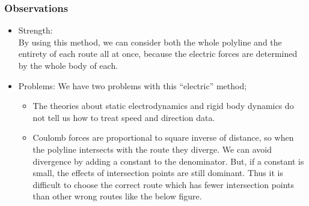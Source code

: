 \documentclass{article}
\numberwithin{equation}{section}
\theoremstyle{definition}
\begin{document}
\subsubsection{Observations}
\begin{itemize}
    \item
    Strength: \\
    By using this method, we can consider both the whole polyline and the entirety of each route all at once, because the electric forces are determined by the whole body of each.
    \item
    Problems: We have two problems with this ``electric'' method;
    \begin{itemize}
        \item
        The theories about static electrodynamics and rigid body dynamics do not tell us how to treat speed and direction data.
        \item
        Coulomb forces are proportional to square inverse of distance, so when the polyline intersects with the route they diverge. We can avoid divergence by adding a constant to the denominator. But, if a constant is small, the effects of intersection points are still dominant.  Thus it is difficult to choose the correct route which has fewer intersection points than other wrong routes like the below figure.  
        

\end{itemize}
\end{itemize}
\end{document}
